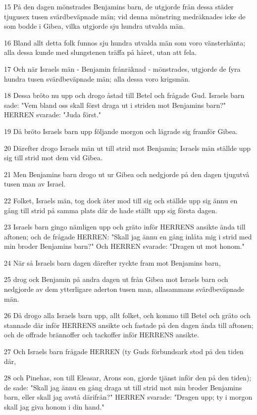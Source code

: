 \par 15 På den dagen mönstrades Benjamins barn, de utgjorde från dessa städer tjugusex tusen svärdbeväpnade män; vid denna mönstring medräknades icke de som bodde i Gibea, vilka utgjorde sju hundra utvalda män.
\par 16 Bland allt detta folk funnos sju hundra utvalda män som voro vänsterhänta; alla dessa kunde med slungstenen träffa på håret, utan att fela.
\par 17 Och när Israels män - Benjamin frånräknad - mönstrades, utgjorde de fyra hundra tusen svärdbeväpnade män; alla dessa voro krigsmän.
\par 18 Dessa bröto nu upp och drogo åstad till Betel och frågade Gud. Israels barn sade: "Vem bland oss skall först draga ut i striden mot Benjamins barn?" HERREN svarade: "Juda först."
\par 19 Då bröto Israels barn upp följande morgon och lägrade sig framför Gibea.
\par 20 Därefter drogo Israels män ut till strid mot Benjamin; Israels män ställde upp sig till strid mot dem vid Gibea.
\par 21 Men Benjamins barn drogo ut ur Gibea och nedgjorde på den dagen tjugutvå tusen man av Israel.
\par 22 Folket, Israels män, tog dock åter mod till sig och ställde upp sig ännu en gång till strid på samma plats där de hade ställt upp sig första dagen.
\par 23 Israels barn gingo nämligen upp och gräto inför HERRENS ansikte ända till aftonen; och de frågade HERREN: "Skall jag ännu en gång inlåta mig i strid med min broder Benjamins barn?" Och HERREN svarade: "Dragen ut mot honom."
\par 24 När så Israels barn dagen därefter ryckte fram mot Benjamins barn,
\par 25 drog ock Benjamin på andra dagen ut från Gibea mot Israels barn och nedgjorde av dem ytterligare aderton tusen man, allasammans svärdbeväpnade män.
\par 26 Då drogo alla Israels barn upp, allt folket, och kommo till Betel och gräto och stannade där inför HERRENS ansikte och fastade på den dagen ända till aftonen; och de offrade brännoffer och tackoffer inför HERRENS ansikte.
\par 27 Och Israels barn frågade HERREN (ty Guds förbundsark stod på den tiden där,
\par 28 och Pinehas, son till Eleasar, Arons son, gjorde tjänst inför den på den tiden); de sade: "Skall jag ännu en gång draga ut till strid mot min broder Benjamins barn, eller skall jag avstå därifrån?" HERREN svarade: "Dragen upp; ty i morgon skall jag giva honom i din hand."
